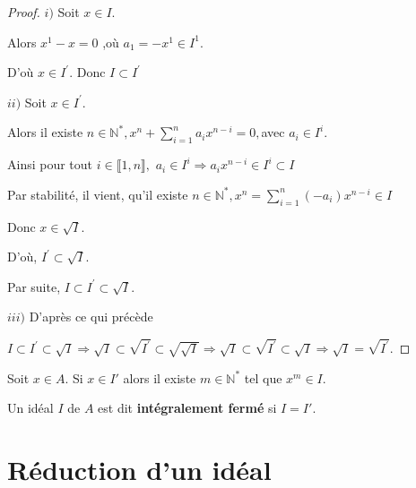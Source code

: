 \begin{proof}
	$i)$ Soit $x\in I.$
	
	Alors $x^{1}-x=0$ ,où $a_{1}=-x^{1}\in I^{1}.$
	
	D'où $x\in I^{\prime }.$ Donc $I\subset I^{\prime }$
	
	$ii)$ Soit $x\in I^{\prime }.$
	
	Alors il existe $n\in \mathbb{N}^{\ast },x^{n}+\sum\limits_{i=1}^{n}a_{i}x^{n-i}=0,$avec $a_{i}\in I^{i}.$
	
	Ainsi pour tout $i\in \llbracket 1, n \rrbracket,$ $a_{i}\in I^{i}\Rightarrow
	a_{i}x^{n-i}\in I^{i}\subset I$
	
	Par stabilité, il vient, qu'il existe $n\in \mathbb{N}^{\ast },x^{n}=\sum\limits_{i=1}^{n}(-a_{i})x^{n-i}\in I$
	
	Donc $x\in \sqrt{I}.$
	
	D'où, $I^{\prime }\subset \sqrt{I}.$
	
	Par suite, $I\subset I^{\prime }\subset \sqrt{I}.$
	
	$iii)$ D'après ce qui précède
	
	$I\subset I^{\prime }\subset \sqrt{I}\Rightarrow \sqrt{I}\subset \sqrt{I^{\prime }}\subset \sqrt{\sqrt{I}}\Rightarrow \sqrt{I}\subset \sqrt{I^{\prime }}\subset \sqrt{I}\Rightarrow \sqrt{I}=\sqrt{I^{\prime }}.$
\end{proof}
\begin{maconsequence}
	Soit $x \in A$.
	Si $x \in I'$ alors il existe $m \in \mathbb{N^*}$ tel que $x^m \in I$.
\end{maconsequence}
\begin{madefinition}
	Un idéal $I$ de $A$ est dit \textbf{intégralement fermé} si $I = I'$.
\end{madefinition}

\section{Réduction d'un idéal}
